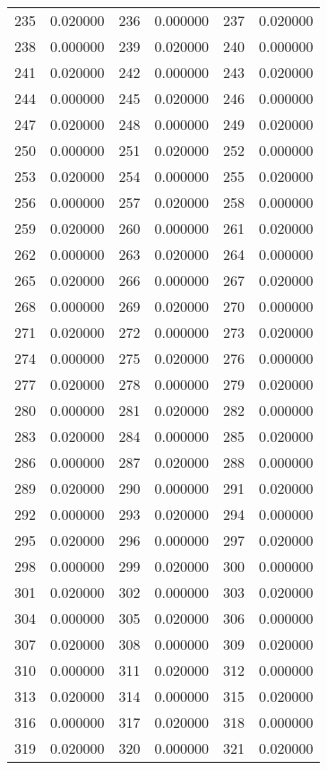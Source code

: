 \documentclass[12pt]{article}
\begin{document}
\begin{longtable}{@{}cc|cc|cc@{}}
235 & 0.020000 & 236 & 0.000000 & 237 & 0.020000 \\
238 & 0.000000 & 239 & 0.020000 & 240 & 0.000000 \\
241 & 0.020000 & 242 & 0.000000 & 243 & 0.020000 \\
244 & 0.000000 & 245 & 0.020000 & 246 & 0.000000 \\
247 & 0.020000 & 248 & 0.000000 & 249 & 0.020000 \\
250 & 0.000000 & 251 & 0.020000 & 252 & 0.000000 \\
253 & 0.020000 & 254 & 0.000000 & 255 & 0.020000 \\
256 & 0.000000 & 257 & 0.020000 & 258 & 0.000000 \\
259 & 0.020000 & 260 & 0.000000 & 261 & 0.020000 \\
262 & 0.000000 & 263 & 0.020000 & 264 & 0.000000 \\
265 & 0.020000 & 266 & 0.000000 & 267 & 0.020000 \\
268 & 0.000000 & 269 & 0.020000 & 270 & 0.000000 \\
271 & 0.020000 & 272 & 0.000000 & 273 & 0.020000 \\
274 & 0.000000 & 275 & 0.020000 & 276 & 0.000000 \\
277 & 0.020000 & 278 & 0.000000 & 279 & 0.020000 \\
280 & 0.000000 & 281 & 0.020000 & 282 & 0.000000 \\
283 & 0.020000 & 284 & 0.000000 & 285 & 0.020000 \\
286 & 0.000000 & 287 & 0.020000 & 288 & 0.000000 \\
289 & 0.020000 & 290 & 0.000000 & 291 & 0.020000 \\
292 & 0.000000 & 293 & 0.020000 & 294 & 0.000000 \\
295 & 0.020000 & 296 & 0.000000 & 297 & 0.020000 \\
298 & 0.000000 & 299 & 0.020000 & 300 & 0.000000 \\
301 & 0.020000 & 302 & 0.000000 & 303 & 0.020000 \\
304 & 0.000000 & 305 & 0.020000 & 306 & 0.000000 \\
307 & 0.020000 & 308 & 0.000000 & 309 & 0.020000 \\
310 & 0.000000 & 311 & 0.020000 & 312 & 0.000000 \\
313 & 0.020000 & 314 & 0.000000 & 315 & 0.020000 \\
316 & 0.000000 & 317 & 0.020000 & 318 & 0.000000 \\
319 & 0.020000 & 320 & 0.000000 & 321 & 0.020000 \\

\end{longtable}
\end{document}
